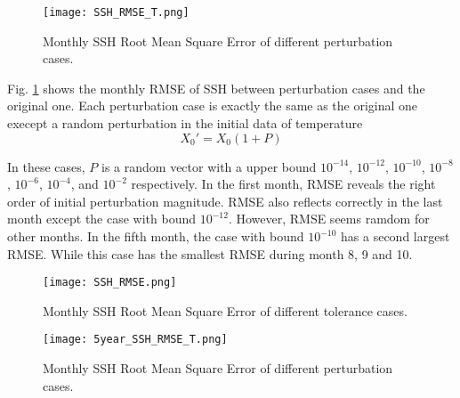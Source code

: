 \documentclass{sig-alternate}
\begin{document}
\begin{figure}
\begin{center}
\texttt{[image: SSH\_RMSE\_T.png]}
\end{center}
\caption[] {Monthly SSH Root Mean Square Error of different perturbation cases.}
\label{fig:ssh_rmse_p}
\end{figure}



Fig. \ref{fig:ssh_rmse_p} shows the monthly RMSE of SSH between perturbation cases and the original one. Each perturbation case is exactly the same as the original one execept a random perturbation in the initial data of temperature
$$X_0' =X_0(1+P)$$

In these cases, $P$ is a random vector with a upper bound $10^{-14}$, $10^{-12}$, $10^{-10}$, $10^{-8}$, $10^{-6}$, $10^{-4}$, and $10^{-2}$ respectively.
In the first month, RMSE reveals the right order of initial perturbation magnitude. RMSE also reflects correctly in the last month except the case with bound $10^{-12}$. However, RMSE seems ramdom for other months. In the fifth month, the case with bound $10^{-10}$ has a second largest RMSE. While this case has the smallest RMSE during month 8, 9 and 10. 

\begin{figure}
\begin{center}
\texttt{[image: SSH\_RMSE.png]}
\end{center}
\caption[] {Monthly SSH Root Mean Square Error of different tolerance cases.}
\label{fig:ssh_rmse_t}
\end{figure}

\begin{figure}
\begin{center}
\texttt{[image: 5year\_SSH\_RMSE\_T.png]}
\end{center}
\caption[] {Monthly SSH Root Mean Square Error of different perturbation cases.}
\label{fig:5year_ssh_rmse_t}
\end{figure}
\end{document}
